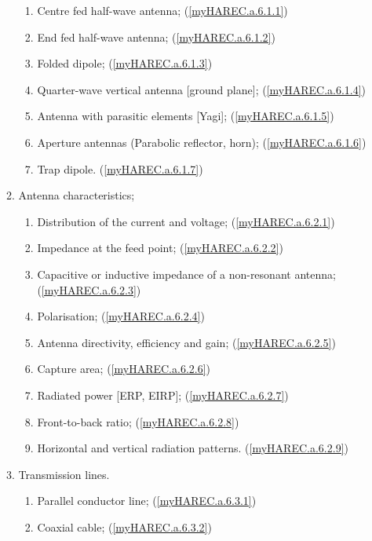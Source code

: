 \begin{enumerate}
\begin{enumerate}[noitemsep]
\begin{enumerate}[noitemsep]
\item Centre fed half-wave antenna; (\ref{myHAREC.a.6.1.1})\label{HAREC.a.6.1.1}
\item End fed half-wave antenna; (\ref{myHAREC.a.6.1.2})\label{HAREC.a.6.1.2}
\item Folded dipole; (\ref{myHAREC.a.6.1.3})\label{HAREC.a.6.1.3}
\item Quarter-wave vertical antenna [ground plane]; (\ref{myHAREC.a.6.1.4})\label{HAREC.a.6.1.4}
\item Antenna with parasitic elements [Yagi]; (\ref{myHAREC.a.6.1.5})\label{HAREC.a.6.1.5}
\item Aperture antennas (Parabolic reflector, horn); (\ref{myHAREC.a.6.1.6})\label{HAREC.a.6.1.6}
\item Trap dipole. (\ref{myHAREC.a.6.1.7})\label{HAREC.a.6.1.7}
\end{enumerate}
\item Antenna characteristics;
\begin{enumerate}[noitemsep]
\item Distribution of the current and voltage; (\ref{myHAREC.a.6.2.1})\label{HAREC.a.6.2.1}
\item Impedance at the feed point; (\ref{myHAREC.a.6.2.2})\label{HAREC.a.6.2.2}
\item Capacitive or inductive impedance of a non-resonant antenna; (\ref{myHAREC.a.6.2.3})\label{HAREC.a.6.2.3}
\item Polarisation; (\ref{myHAREC.a.6.2.4})\label{HAREC.a.6.2.4}
\item Antenna directivity, efficiency and gain; (\ref{myHAREC.a.6.2.5})\label{HAREC.a.6.2.5}
\item Capture area; (\ref{myHAREC.a.6.2.6})\label{HAREC.a.6.2.6}
\item Radiated power [ERP, EIRP]; (\ref{myHAREC.a.6.2.7})\label{HAREC.a.6.2.7}
\item Front-to-back ratio; (\ref{myHAREC.a.6.2.8})\label{HAREC.a.6.2.8}
\item Horizontal and vertical radiation patterns. (\ref{myHAREC.a.6.2.9})\label{HAREC.a.6.2.9}
\end{enumerate}
\item Transmission lines.
\begin{enumerate}[noitemsep]
\item Parallel conductor line; (\ref{myHAREC.a.6.3.1})\label{HAREC.a.6.3.1}
\item Coaxial cable; (\ref{myHAREC.a.6.3.2})\label{HAREC.a.6.3.2}

\end{enumerate}
\end{enumerate}
\end{enumerate}
